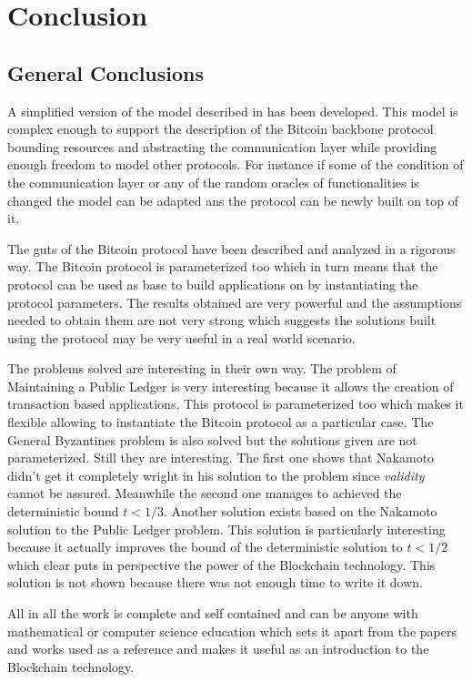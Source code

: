 \documentclass[..]{subfiles}
\begin{document}
\chapter{Conclusion}\label{chap:conclusion}

\section{General Conclusions}

A simplified version of the model described in \cite{canetti2001universally} has been developed. This model is complex enough to support the description of the Bitcoin backbone protocol bounding resources and abstracting the communication layer while providing enough freedom to model other protocols. For instance if some of the condition of the communication layer or any of the random oracles of functionalities is changed the model can be adapted ans the protocol can be newly built on top of it.

The guts of the Bitcoin protocol have been described and analyzed in a rigorous way. The Bitcoin protocol is parameterized too which in turn means that the protocol can be used as base to build applications on by instantiating the protocol parameters. The results obtained are very powerful and the assumptions needed to obtain them are not very strong which suggests the solutions built using the protocol may be very useful in a real world scenario.

The problems solved are interesting in their own way. The problem of Maintaining a Public Ledger is very interesting because it allows the creation of transaction based applications. This protocol is parameterized too which makes it flexible allowing to instantiate the Bitcoin protocol as a particular case. The General Byzantines problem is also solved but the solutions given are not parameterized. Still they are interesting. The first one shows that Nakamoto didn't get it completely wright in his solution to the problem since \textit{validity} cannot be assured. Meanwhile the second one manages to achieved the deterministic bound $t < 1/3$. Another solution exists based on the Nakamoto solution to the Public Ledger problem. This solution is particularly interesting because it actually improves the bound of the deterministic solution to $t < 1/2$ which clear puts in perspective the power of the Blockchain technology. This solution is not shown because there was not enough time to write it down.

All in all the work is complete and self contained and can be anyone with mathematical or computer science education which sets it apart from the papers and works used as a reference and makes it useful as an introduction to the Blockchain technology.
\end{document}
